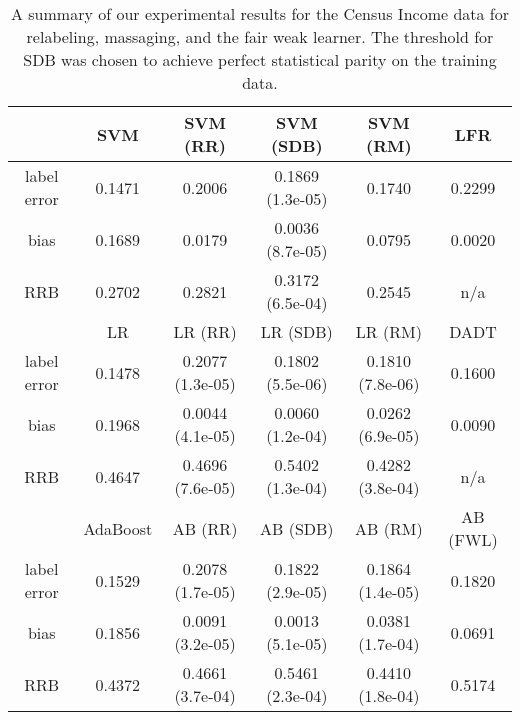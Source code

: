 \begin{table}[h]
\centering
\begin{tabular}{| c | ccccc |}
\hline
               & SVM & SVM (RR) & SVM (SDB) & SVM (RM) & LFR \cite{ZemelWSPD13} \\
\hline
label error    & 0.1471 & 0.2006 & 0.1869 (1.3e-05) & 0.1740 & 0.2299 \\
bias           & 0.1689 & 0.0179 & 0.0036 (8.7e-05) & 0.0795 & 0.0020 \\
RRB            & 0.2702 & 0.2821 & 0.3172 (6.5e-04) & 0.2545 & n/a \\
\hline
               & LR & LR (RR) & LR (SDB) & LR (RM) & DADT \cite{KamiranCP10} \\
\hline
label error    & 0.1478 & 0.2077 (1.3e-05) & 0.1802 (5.5e-06) & 0.1810 (7.8e-06) & 0.1600 \\
bias           & 0.1968 & 0.0044 (4.1e-05) & 0.0060 (1.2e-04) & 0.0262 (6.9e-05) & 0.0090 \\
RRB            & 0.4647 & 0.4696 (7.6e-05) & 0.5402 (1.3e-04) & 0.4282 (3.8e-04) & n/a \\
\hline
               & AdaBoost & AB (RR) & AB (SDB) & AB (RM) & AB (FWL)  \\
\hline
label error    & 0.1529 & 0.2078 (1.7e-05) & 0.1822 (2.9e-05) & 0.1864 (1.4e-05) & 0.1820 \\
bias           & 0.1856 & 0.0091 (3.2e-05) & 0.0013 (5.1e-05) & 0.0381 (1.7e-04) & 0.0691  \\
RRB            & 0.4372 & 0.4661 (3.7e-04) & 0.5461 (2.3e-04) & 0.4410 (1.8e-04) & 0.5174  \\
\hline
\hline
\end{tabular}
\caption{A summary of our experimental results for the Census Income data for
relabeling, massaging, and the fair weak learner. The threshold for SDB was
chosen to achieve perfect statistical parity on the training data.}
\label{table:census_results}
\end{table}

